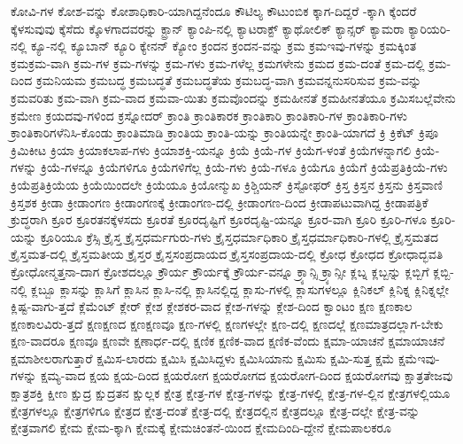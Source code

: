 {ಕೋವಿ-ಗಳ
ಕೋಶ-ವನ್ನು
ಕೋಶಾಧಿಕಾರಿ-ಯಾಗಿದ್ದನೆಂದೂ
ಕೌಟಿಲ್ಯ
ಕೌಟುಂಬಿಕ
ಕ್ಕಾಗ-ದಿದ್ದರೆ
-ಕ್ಕಾಗಿ
ಕ್ಕೆಂದರೆ
ಕ್ಕೆಳಸುವುವು
ಕ್ಕೆಸೆದು
ಕ್ಕೊಳಗಾದವರನ್ನು
ಕ್ಟ್ರಾನ್
ಕ್ಯಾಂಪಿ-ನಲ್ಲಿ
ಕ್ಯಾಟರಾಕ್ಟ್
ಕ್ಯಾಥೋಲಿಕ್
ಕ್ಯಾನ್ಸರ್
ಕ್ಯಾಮರಾ
ಕ್ಯಾರಿಯರಿ-ನಲ್ಲಿ
ಕ್ಯೂ-ನಲ್ಲಿ
ಕ್ಯೂಬಾನ್
ಕ್ಯೂರಿ
ಕ್ಯೇನನ್
ಕ್ಯೋಂ
ಕ್ರಂದನ
ಕ್ರಂದನ-ವನ್ನು
ಕ್ರಮ
ಕ್ರಮಇವು-ಗಳನ್ನು
ಕ್ರಮಕ್ಕಿಂತ
ಕ್ರಮಕ್ರಮ-ವಾಗಿ
ಕ್ರಮ-ಗಳ
ಕ್ರಮ-ಗಳನ್ನು
ಕ್ರಮ-ಗಳು
ಕ್ರಮ-ಗಳೆಲ್ಲ
ಕ್ರಮಗಳೇನು
ಕ್ರಮದ
ಕ್ರಮ-ದಂತೆ
ಕ್ರಮ-ದಲ್ಲಿ
ಕ್ರಮ-ದಿಂದ
ಕ್ರಮನಿಯಮ
ಕ್ರಮಬದ್ಧ
ಕ್ರಮಬದ್ಧತೆ
ಕ್ರಮಬದ್ಧತೆಯ
ಕ್ರಮಬದ್ಧ-ವಾಗಿ
ಕ್ರಮವನ್ನನುಸರಿಸುವ
ಕ್ರಮ-ವನ್ನು
ಕ್ರಮವರಿತು
ಕ್ರಮ-ವಾಗಿ
ಕ್ರಮ-ವಾದ
ಕ್ರಮವಾ-ಯಿತು
ಕ್ರಮವೊಂದನ್ನು
ಕ್ರಮಹೀನತೆ
ಕ್ರಮಹೀನತೆಯೂ
ಕ್ರಮಿಸಬಲ್ಲೆವೇನು
ಕ್ರಮೇಣ
ಕ್ರಯದವು-ಗಳಿಂದ
ಕ್ರಸ್ನೋದರ್
ಕ್ರಾಂತಿ
ಕ್ರಾಂತಿಕಾರಕ
ಕ್ರಾಂತಿಕಾರಿ
ಕ್ರಾಂತಿಕಾರಿ-ಗಳ
ಕ್ರಾಂತಿಕಾರಿ-ಗಳು
ಕ್ರಾಂತಿಕಾರಿಗಳೆನಿಸಿ-ಕೊಂಡು
ಕ್ರಾಂತಿಮಾಡಿ
ಕ್ರಾಂತಿಯ
ಕ್ರಾಂತಿ-ಯನ್ನು
ಕ್ರಾಂತಿಯನ್ನೇ
ಕ್ರಾಂತಿ-ಯಾಗದೆ
ಕ್ರಿ
ಕ್ರಿಕೆಟ್
ಕ್ರಿಪೂ
ಕ್ರಿಮಿಕೀಟ
ಕ್ರಿಯಾ
ಕ್ರಿಯಾಕಲಾಪ-ಗಳು
ಕ್ರಿಯಾಶಕ್ತಿ-ಯನ್ನೂ
ಕ್ರಿಯೆ
ಕ್ರಿಯೆ-ಗಳ
ಕ್ರಿಯೆಗ-ಳಂತೆ
ಕ್ರಿಯೆಗಳನ್ನಾಗಲಿ
ಕ್ರಿಯೆ-ಗಳನ್ನು
ಕ್ರಿಯೆ-ಗಳನ್ನೂ
ಕ್ರಿಯೆಗಳಿಗೂ
ಕ್ರಿಯೆಗಳಿಗೆಲ್ಲ
ಕ್ರಿಯೆ-ಗಳು
ಕ್ರಿಯೆ-ಗಳೂ
ಕ್ರಿಯೆಗೂ
ಕ್ರಿಯೆಗೆ
ಕ್ರಿಯೆಪ್ರತಿಕ್ರಿಯೆ-ಗಳು
ಕ್ರಿಯೆಪ್ರತಿಕ್ರಿಯೆಯ
ಕ್ರಿಯೆಯಿಂದಲೇ
ಕ್ರಿಯೆಯೂ
ಕ್ರಿಯೋನ್ಮುಖ
ಕ್ರಿಶ್ಚಿಯನ್
ಕ್ರಿಸ್ಟೋಫರ್
ಕ್ರಿಸ್ತ
ಕ್ರಿಸ್ತನ
ಕ್ರಿಸ್ತನು
ಕ್ರಿಸ್ತವಾಣಿ
ಕ್ರಿಸ್ತಶಕ
ಕ್ರೀಡಾ
ಕ್ರೀಡಾಂಗಣ
ಕ್ರೀಡಾಂಗಣಕ್ಕೆ
ಕ್ರೀಡಾಂಗಣ-ದಲ್ಲಿ
ಕ್ರೀಡಾಂಗಣ-ದಿಂದ
ಕ್ರೀಡಾಪಟುವಾಗಿದ್ದ
ಕ್ರೀಡಾಪತ್ರಿಕೆ
ಕ್ರುದ್ಧರಾಗಿ
ಕ್ರೂರ
ಕ್ರೂರತನಕ್ಕೆಳಸದು
ಕ್ರೂರತೆ
ಕ್ರೂರದೃಷ್ಟಿಗೆ
ಕ್ರೂರದೃಷ್ಟಿ-ಯನ್ನೂ
ಕ್ರೂರ-ವಾಗಿ
ಕ್ರೂರಿ
ಕ್ರೂರಿ-ಗಳೂ
ಕ್ರೂರಿ-ಯನ್ನು
ಕ್ರೂರಿಯೂ
ಕ್ರೆಸ್ಸಿ
ಕ್ರೈಸ್ತ
ಕ್ರೈಸ್ತಧರ್ಮಗುರು-ಗಳು
ಕ್ರೈಸ್ತಧರ್ಮಾಧಿಕಾರಿ
ಕ್ರೈಸ್ತಧರ್ಮಾಧಿಕಾರಿ-ಗಳಲ್ಲಿ
ಕ್ರೈಸ್ತಮತದ
ಕ್ರೈಸ್ತಮತ-ದಲ್ಲಿ
ಕ್ರೈಸ್ತಮತೀಯ
ಕ್ರೈಸ್ತರ
ಕ್ರೈಸ್ತಸಂಪ್ರದಾಯದ
ಕ್ರೈಸ್ತಸಂಪ್ರದಾಯ-ದಲ್ಲಿ
ಕ್ರೋಧ
ಕ್ರೋಧದ
ಕ್ರೋಧಾದ್ಭವತಿ
ಕ್ರೋಧೋನ್ಮತ್ತನಾ-ದಾಗ
ಕ್ರೋಶದಲ್ಲೂ
ಕ್ರೌರ್ಯ
ಕ್ರೌರ್ಯಕ್ಕೆ
ಕ್ರೌರ್ಯ-ವನ್ನೂ
ಕ್ರ್ಯಾನ್ಸಿ
ಕ್ರ್ಯಾನ್ಸೀ
ಕ್ಲಬ್ನ
ಕ್ಲಬ್ಬನ್ನು
ಕ್ಲಬ್ಬಿಗೆ
ಕ್ಲಬ್ಬಿ-ನಲ್ಲಿ
ಕ್ಲಬ್ಬೂ
ಕ್ಲಾಸನ್ನು
ಕ್ಲಾಸಿಗೆ
ಕ್ಲಾಸಿನ
ಕ್ಲಾಸಿ-ನಲ್ಲಿ
ಕ್ಲಾಸಿನಲ್ಲಿದ್ದ
ಕ್ಲಾಸು-ಗಳಲ್ಲಿ
ಕ್ಲಾಸುಗಳಲ್ಲೂ
ಕ್ಲಿನಿಕಲ್
ಕ್ಲಿನಿಕ್ನ
ಕ್ಲಿನಿಕ್ನಲ್ಲೇ
ಕ್ಲಿಷ್ಟ-ವಾಗು-ತ್ತದೆ
ಕ್ಲೆಮೆಂಟ್
ಕ್ಲೇರ್
ಕ್ಲೇಶ
ಕ್ಲೇಶಕರ-ವಾದ
ಕ್ಲೇಶ-ಗಳನ್ನು
ಕ್ಲೇಶ-ದಿಂದ
ಕ್ವಾಂಟಂ
ಕ್ಷಣ
ಕ್ಷಣಕಾಲ
ಕ್ಷಣಕಾಲವಿರು-ತ್ತದೆ
ಕ್ಷಣಕ್ಷಣದ
ಕ್ಷಣಕ್ಷಣವೂ
ಕ್ಷಣ-ಗಳಲ್ಲಿ
ಕ್ಷಣಗಳಲ್ಲೇ
ಕ್ಷಣ-ದಲ್ಲಿ
ಕ್ಷಣದಲ್ಲೆ
ಕ್ಷಣಮಾತ್ರದಲ್ಲಾಗ-ಬೇಕು
ಕ್ಷಣ-ವಾದರೂ
ಕ್ಷಣವೂ
ಕ್ಷಣವೇ
ಕ್ಷಣಾರ್ಧ-ದಲ್ಲಿ
ಕ್ಷಣಿಕ
ಕ್ಷಣಿಕ-ವಾದ
ಕ್ಷಣಿಕ-ವೆಂದು
ಕ್ಷಮಾ-ಯಾಚನೆ
ಕ್ಷಮಾಯಾಚನೆ
ಕ್ಷಮಾಶೀಲರಾಗುತ್ತಾರೆ
ಕ್ಷಮಿಸ-ಲಾರದು
ಕ್ಷಮಿಸಿ
ಕ್ಷಮಿಸಿದ್ದಳು
ಕ್ಷಮಿಸಿಯಾನು
ಕ್ಷಮಿಸು
ಕ್ಷಮಿ-ಸುತ್ತ
ಕ್ಷಮೆ
ಕ್ಷಮೆಇವು-ಗಳನ್ನು
ಕ್ಷಮ್ಯ-ವಾದ
ಕ್ಷಯ
ಕ್ಷಯ-ದಿಂದ
ಕ್ಷಯರೋಗ
ಕ್ಷಯರೋಗದ
ಕ್ಷಯರೋಗ-ದಿಂದ
ಕ್ಷಯರೋಗವು
ಕ್ಷಾತ್ರತೇಜವು
ಕ್ಷಾತ್ರಶಕ್ತಿ
ಕ್ಷೀಣ
ಕ್ಷುದ್ರ
ಕ್ಷುದ್ರತನ
ಕ್ಷುಲ್ಲಕ
ಕ್ಷೇತ್ರ
ಕ್ಷೇತ್ರ-ಗಳ
ಕ್ಷೇತ್ರ-ಗಳನ್ನು
ಕ್ಷೇತ್ರ-ಗಳಲ್ಲಿ
ಕ್ಷೇತ್ರ-ಗಳ-ಲ್ಲಿನ
ಕ್ಷೇತ್ರಗಳಲ್ಲಿಯೂ
ಕ್ಷೇತ್ರಗಳಲ್ಲೂ
ಕ್ಷೇತ್ರಗಳಿಗೂ
ಕ್ಷೇತ್ರದ
ಕ್ಷೇತ್ರ-ದಂತೆ
ಕ್ಷೇತ್ರ-ದಲ್ಲಿ
ಕ್ಷೇತ್ರದಲ್ಲಿನ
ಕ್ಷೇತ್ರದಲ್ಲೂ
ಕ್ಷೇತ್ರ-ದಲ್ಲೇ
ಕ್ಷೇತ್ರ-ವನ್ನು
ಕ್ಷೇತ್ರವಾಗಲಿ
ಕ್ಷೇಮ
ಕ್ಷೇಮ-ಕ್ಕಾಗಿ
ಕ್ಷೇಮಕ್ಕೆ
ಕ್ಷೇಮಚಿಂತನೆ-ಯಿಂದ
ಕ್ಷೇಮದಿಂದಿ-ದ್ದೇನೆ
ಕ್ಷೇಮಪಾಲಕರೂ
}
